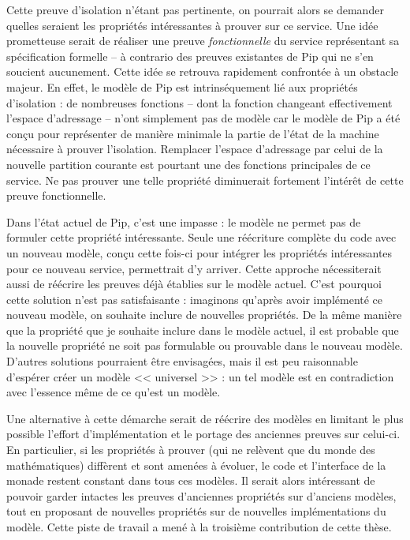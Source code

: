		Cette preuve d'isolation n'étant pas pertinente, on pourrait alors se demander quelles seraient les propriétés intéressantes à prouver sur ce service. Une idée prometteuse serait de réaliser une preuve \emph{fonctionnelle} du service représentant sa spécification formelle -- à contrario des preuves existantes de Pip qui ne s'en soucient aucunement. Cette idée se retrouva rapidement confrontée à un obstacle majeur. En effet, le modèle de Pip est intrinséquement lié aux propriétés d'isolation : de nombreuses fonctions -- dont la fonction changeant effectivement l'espace d'adressage -- n'ont simplement pas de modèle car le modèle de Pip a été conçu pour représenter de manière minimale la partie de l'état de la machine nécessaire à prouver l'isolation. Remplacer l'espace d'adressage par celui de la nouvelle partition courante est pourtant une des fonctions principales de ce service. Ne pas prouver une telle propriété diminuerait fortement l'intérêt de cette preuve fonctionnelle.

		Dans l'état actuel de Pip, c'est une impasse : le modèle ne permet pas de formuler cette propriété intéressante. Seule une réécriture complète du code avec un nouveau modèle, conçu cette fois-ci pour intégrer les propriétés intéressantes pour ce nouveau service, permettrait d'y arriver. Cette approche nécessiterait aussi de réécrire les preuves déjà établies sur le modèle actuel.
		C'est pourquoi cette solution n'est pas satisfaisante : imaginons qu'après avoir implémenté ce nouveau modèle, on souhaite inclure de nouvelles propriétés. De la même manière que la propriété que je souhaite inclure dans le modèle actuel, il est probable que la nouvelle propriété ne soit pas formulable ou prouvable dans le nouveau modèle. D'autres solutions pourraient être envisagées, mais il est peu raisonnable d'espérer créer un modèle << universel >> : un tel modèle est en contradiction avec l'essence même de ce qu'est un modèle.

		Une alternative à cette démarche serait de réécrire des modèles en limitant le plus possible l'effort d'implémentation et le portage des anciennes preuves sur celui-ci. En particulier, si les propriétés à prouver (qui ne relèvent que du monde des mathématiques) diffèrent et sont amenées à évoluer, le code et l'interface de la monade restent constant dans tous ces modèles. Il serait alors intéressant de pouvoir garder intactes les preuves d'anciennes propriétés sur d'anciens modèles, tout en proposant de nouvelles propriétés sur de nouvelles implémentations du modèle. Cette piste de travail a mené à la troisième contribution de cette thèse.

